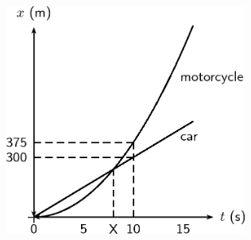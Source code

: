 \begin{enumerate}[noitemsep, label=\textbf{\arabic*}. ]
	\begin{figure}[H] %
    \begin{center}
    \label{m38796*id82149!!!underscore!!!media}\label{m38796*id82149!!!underscore!!!printimage}\includegraphics[width=300px]{col11305.imgs/m38796_PG10C2_053.png} %
        
      \vspace{2pt}
    \vspace{.1in}
    
    \end{center}

 \end{figure}   


\end{enumerate}
